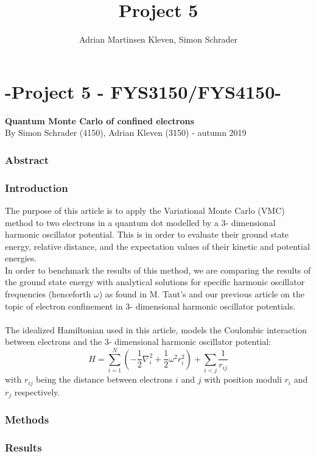 \documentclass[10pt,a4paper]{article}
\author{Adrian Martinsen Kleven, Simon Schrader}
\title{Project 5}
\begin{document}
\part*{-Project 5 - FYS3150/FYS4150-
}
{\large \textbf{Quantum Monte Carlo of confined electrons}}\\
{\large By Simon Schrader (4150), Adrian Kleven (3150) - autumn 2019
}
\tableofcontents

\listoffigures
\listoftables


\clearpage

\section{Abstract}

\cite{Project2}
\cite{hammond1994monte}
\section{Introduction}
The purpose of this article is to apply the Variational Monte Carlo (VMC) method to two electrons in a quantum dot modelled by a 3- dimensional harmonic oscillator potential. This is in order to evaluate their ground state energy, relative distance, and the expectation values of their kinetic and potential energies.\\In order to benchmark the results of this method, we are comparing the results of the ground state energy with analytical solutions for specific harmonic oscillator frequencies (henceforth $\omega$) as found in M. Taut's \cite{PhysRevA.48.3561} and our previous article \cite{Project2} on the topic of electron confinement in 3- dimensional harmonic oscillator potentials.\\\\The idealized Hamiltonian used in this article, models the Coulombic interaction between electrons and the 3- dimensional harmonic oscillator potential: 
\begin{equation}
  \label{eq:finalH}
  \hat{H}=\sum_{i=1}^{N} \left(  -\frac{1}{2} \nabla_i^2 + \frac{1}{2} \omega^2r_i^2  \right)+\sum_{i<j}\frac{1}{r_{ij}}
\end{equation}
\cite{Problem_set_5} with $r_{ij}$ being the distance between electrons $i$ and $j$ with position moduli $r_i$ and $r_j$ respectively.
\section{Methods}

\section{Results}
\end{document}

